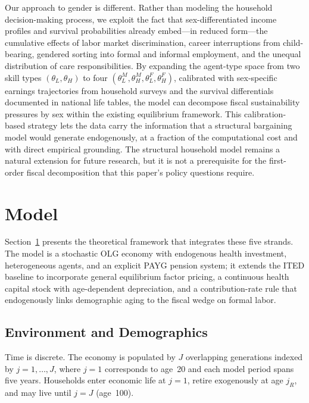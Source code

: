 \documentclass[12pt,a4paper]{article}
\begin{document}
Our approach to gender is different. Rather than modeling the household decision-making process, we exploit the fact that sex-differentiated income profiles and survival probabilities already embed---in reduced form---the cumulative effects of labor market discrimination, career interruptions from child-bearing, gendered sorting into formal and informal employment, and the unequal distribution of care responsibilities. By expanding the agent-type space from two skill types $(\theta_L, \theta_H)$ to four $(\theta_L^M, \theta_H^M, \theta_L^F, \theta_H^F)$, calibrated with sex-specific earnings trajectories from household surveys and the survival differentials documented in national life tables, the model can decompose fiscal sustainability pressures by sex within the existing equilibrium framework. This calibration-based strategy lets the data carry the information that a structural bargaining model would generate endogenously, at a fraction of the computational cost and with direct empirical grounding. The structural household model remains a natural extension for future research, but it is not a prerequisite for the first-order fiscal decomposition that this paper's policy questions require.

\bigskip

\section{Model}
\label{sec:model}

\bigskip

Section~\ref{sec:model} presents the theoretical framework that integrates these five strands. The model is a stochastic OLG economy with endogenous health investment, heterogeneous agents, and an explicit PAYG pension system; it extends the ITED baseline \citep{CortesEtAl2024} to incorporate general equilibrium factor pricing, a continuous health capital stock with age-dependent depreciation, and a contribution-rate rule that endogenously links demographic aging to the fiscal wedge on formal labor.
\subsection{Environment and Demographics}
\label{subsec:environment}

Time is discrete. The economy is populated by $J$ overlapping generations indexed by $j = 1, \ldots, J$, where $j = 1$ corresponds to age~20 and each model period spans five years. Households enter economic life at $j = 1$, retire exogenously at age $j_R$, and may live until $j = J$ (age~100).
\end{document}
